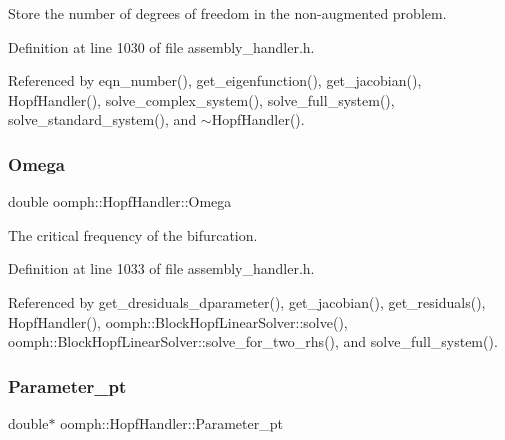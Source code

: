 Store the number of degrees of freedom in the non-\/augmented problem. 



Definition at line 1030 of file assembly\+\_\+handler.\+h.



Referenced by eqn\+\_\+number(), get\+\_\+eigenfunction(), get\+\_\+jacobian(), Hopf\+Handler(), solve\+\_\+complex\+\_\+system(), solve\+\_\+full\+\_\+system(), solve\+\_\+standard\+\_\+system(), and $\sim$\+Hopf\+Handler().

\mbox{\label{classoomph_1_1HopfHandler_a1dc27019f4889918cd01207576eabaea}} 
\subsubsection{\texorpdfstring{Omega}{Omega}}
{\footnotesize\ttfamily double oomph\+::\+Hopf\+Handler\+::\+Omega\hspace{0.3cm}{\ttfamily [private]}}



The critical frequency of the bifurcation. 



Definition at line 1033 of file assembly\+\_\+handler.\+h.



Referenced by get\+\_\+dresiduals\+\_\+dparameter(), get\+\_\+jacobian(), get\+\_\+residuals(), Hopf\+Handler(), oomph\+::\+Block\+Hopf\+Linear\+Solver\+::solve(), oomph\+::\+Block\+Hopf\+Linear\+Solver\+::solve\+\_\+for\+\_\+two\+\_\+rhs(), and solve\+\_\+full\+\_\+system().

\mbox{\label{classoomph_1_1HopfHandler_aff98f00728cd365d552229fec352f4e6}} 
\subsubsection{\texorpdfstring{Parameter\+\_\+pt}{Parameter\_pt}}
{\footnotesize\ttfamily double$\ast$ oomph\+::\+Hopf\+Handler\+::\+Parameter\+\_\+pt\hspace{0.3cm}{\ttfamily [private]}}




